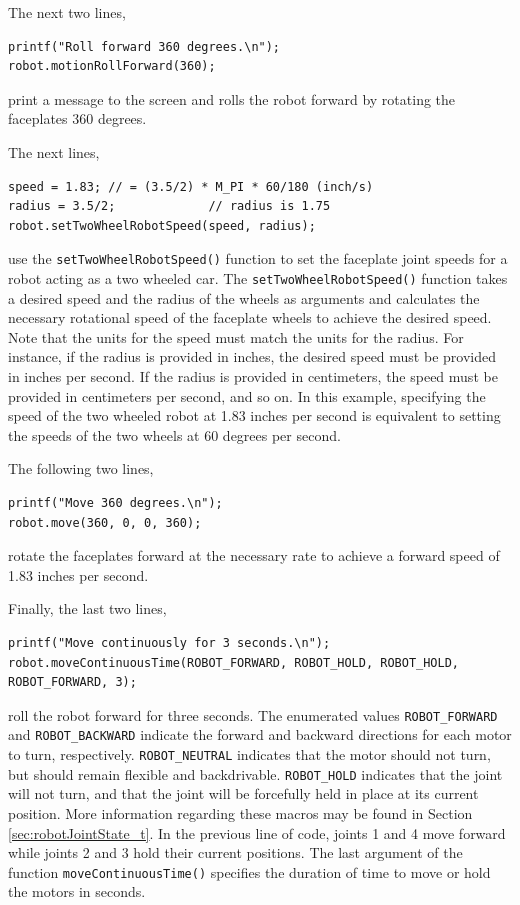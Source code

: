 \documentclass{article}
\begin{document}
The next two lines,
\begin{verbatim}
printf("Roll forward 360 degrees.\n");
robot.motionRollForward(360);
\end{verbatim}
print a message to the screen and rolls the robot forward by rotating the faceplates
360 degrees.

The next lines,
\begin{verbatim}
speed = 1.83; // = (3.5/2) * M_PI * 60/180 (inch/s)
radius = 3.5/2;             // radius is 1.75 
robot.setTwoWheelRobotSpeed(speed, radius);
\end{verbatim}
use the \texttt{setTwoWheelRobotSpeed()} function to set the faceplate joint
speeds for a robot acting as a two wheeled car. The
\texttt{setTwoWheelRobotSpeed()} function takes a desired speed
and the radius of the wheels as arguments and calculates the necessary
rotational speed of the faceplate wheels to achieve the desired speed. Note
that the units for the speed must match the units for the radius. For instance,
if the radius is provided in inches, the desired speed must be provided in 
inches per second. If the radius is provided in centimeters, the speed must
be provided in centimeters per second, and so on. In this example, specifying 
the speed of the two wheeled robot at 1.83 inches per second is equivalent to setting
the speeds of the two wheels at 60 degrees per second.

The following two lines,
\begin{verbatim}
printf("Move 360 degrees.\n");
robot.move(360, 0, 0, 360);
\end{verbatim}
rotate the faceplates forward at the necessary rate to achieve a forward speed of
1.83 inches per second.

Finally, the last two lines,
\begin{verbatim}
printf("Move continuously for 3 seconds.\n");
robot.moveContinuousTime(ROBOT_FORWARD, ROBOT_HOLD, ROBOT_HOLD, ROBOT_FORWARD, 3);
\end{verbatim}
roll the robot forward for three seconds.
The enumerated values \texttt{ROBOT\_FORWARD} and \texttt{ROBOT\_BACKWARD}
indicate the forward and backward directions for each motor to turn, respectively. 
\texttt{ROBOT\_NEUTRAL} indicates that the motor should not turn, but
should remain flexible and backdrivable. \texttt{ROBOT\_HOLD}
indicates that the joint will not turn, and that the joint will be 
forcefully held in place at its current position. More information regarding these
macros may be found in Section \ref{sec:robotJointState_t}. In the previous
line of code, joints 1 and 4 
move forward while joints 2 and 3 hold their current positions. The
last argument  of the function \texttt{moveContinuousTime()} specifies the
duration of time to move or hold the motors in seconds.
\end{document}
